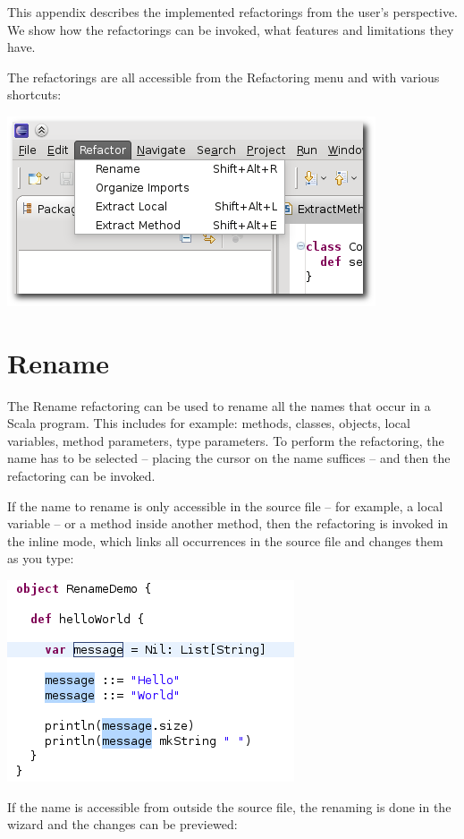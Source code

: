 \documentclass[10pt,a4paper,oneside]{scrreprt}
\begin{document}
This appendix describes the implemented refactorings from the user's perspective. We show how the refactorings can be invoked, what features and limitations they have.

The refactorings are all accessible from the Refactoring menu and with various shortcuts:

\begin{center}
  \includegraphics[width=0.6\linewidth]{refactoring-menu-screenshot.png}
\end{center}

\section{Rename}

The Rename refactoring can be used to rename all the names that occur in a Scala program. This includes for example: methods, classes, objects, local variables, method parameters, type parameters. To perform the refactoring, the name has to be selected -- placing the cursor on the name suffices -- and then the refactoring can be invoked. 

If the name to rename is only accessible in the source file -- for example,  a local variable -- or a method inside another method, then the refactoring is invoked in the inline mode, which links all occurrences in the source file and changes them as you type:

\begin{center}
  \includegraphics[width=0.5\linewidth]{rename_screenshot_3.png}
\end{center}

If the name is accessible from outside the source file, the renaming is done in the wizard and the changes can be previewed:
\end{document}
